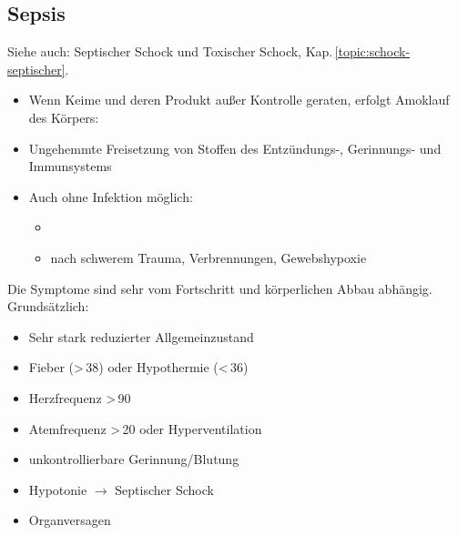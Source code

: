 


\subsection{Sepsis}
\label{topic:sepsis}

Siehe auch: Septischer Schock und Toxischer Schock,
Kap.\,\ref{topic:schock-septischer}.

\begin{itemize}
  \item Wenn Keime und deren Produkt außer Kontrolle geraten,
  erfolgt Amoklauf des Körpers:
  \item Ungehemmte Freisetzung von Stoffen des Entzündungs-, Gerinnungs-
  und Immunsystems
  \item Auch ohne Infektion möglich:
  \begin{itemize}
    \item {}
    \item nach schwerem Trauma, Verbrennungen, Gewebshypoxie
  \end{itemize}
\end{itemize}


{
Die Symptome sind sehr vom Fortschritt und
körperlichen Abbau abhängig. Grundsätzlich:


\begin{itemize}
  \item Sehr stark reduzierter Allgemeinzustand
  \item Fieber ({\textgreater}\,38{\textcelsius}) oder
  Hypothermie ({\textless}\,36{\textcelsius})
  \item Herzfrequenz {\textgreater}\,90
  \item Atemfrequenz {\textgreater}\,20 oder
  Hyperventilation
  \item unkontrollierbare Gerinnung/Blutung
  \item Hypotonie ${\rightarrow}$ Septischer Schock
  \item Organversagen
\end{itemize}

}{}{}{}{}
